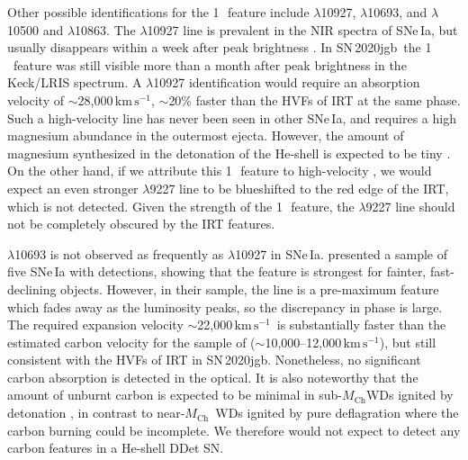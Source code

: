 \documentclass[twocolumn]{aastex631}
\newcommand{\sn}{SN\,2020jgb}
\newcommand{\Mch}{$M_\mathrm{Ch}$}
\newcommand{\kms}{$\mathrm{km}\,\mathrm{s}^{-1}$}
\newcommand{\chang}[1]{\textcolor{blue}{[Chang: #1]}}
\begin{document}
Other possible identifications for the 1\,\micron\ feature include  $\lambda$10927,  $\lambda$10693, and  $\lambda$10500 and $\lambda$10863. The  $\lambda$10927 line is prevalent in the NIR spectra of SNe\,Ia, but usually disappears within a week after peak brightness \citep{Marion2009_NIR}. In \sn\ the 1\,\micron\ feature was still visible more than a month after peak brightness in the Keck/LRIS spectrum. A  $\lambda$10927 identification would require an absorption velocity of $\sim$28,000\,\kms, $\sim$20\% faster than the HVFs of  IRT at the same phase. Such a high-velocity  line has never been seen in other SNe\,Ia, and requires a high magnesium abundance in the outermost ejecta. However, the amount of magnesium synthesized in the detonation of the He-shell is expected to be tiny \citep{Fink_DD_2010,Kromer_DD_2010}. On the other hand, if we attribute this 1\,\micron\ feature to high-velocity , we would expect an even stronger  $\lambda$9227 line to be blueshifted to the red edge of the  IRT, which is not detected. Given the strength of the 1\,\micron\ feature, the  $\lambda$9227 line should not be completely obscured by the  IRT features.

 $\lambda$10693 is not observed as frequently as  $\lambda$10927 in SNe\,Ia. \citet{Hsiao_CSP_2019} presented a sample of five SNe\,Ia with  detections, showing that the  feature is strongest for fainter, fast-declining objects. However, in their sample, the  line is a pre-maximum feature which fades away as the luminosity peaks, so the discrepancy in phase is large. The required expansion velocity $\sim$22,000\,\kms\ is substantially faster than the estimated carbon velocity for the sample of \citet{Hsiao_CSP_2019} ($\sim$10,000--12,000\,\kms), but still consistent with the HVFs of  IRT in \sn. Nonetheless, no significant carbon absorption is detected in the optical. It is also noteworthy that the amount of unburnt carbon is expected to be minimal in sub-\Mch WDs ignited by detonation \citep{polin_observational_2019}, in contrast to near-\Mch\ WDs ignited by pure deflagration where the carbon burning could be incomplete. We therefore would not expect to detect any carbon features in a He-shell DDet SN.
\end{document}
